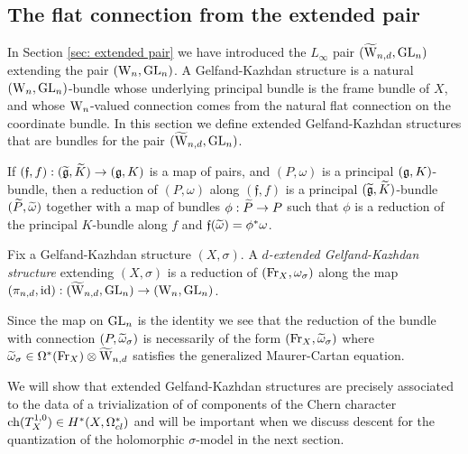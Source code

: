 
\subsection{The flat connection from the extended pair} \label{sec: extended gk}

In Section \ref{sec: extended pair} we have introduced the $L_\infty$ pair $(\TVectd, \GL_n)$ extending the pair $(\Vect, \GL_n)$.
A Gelfand-Kazhdan structure is a natural $(\Vect,\GL_n)$-bundle whose underlying principal bundle is the frame bundle of $X$, and whose $\Vect$-valued connection comes from the natural flat connection on the coordinate bundle. 
In this section we define extended Gelfand-Kazhdan structures that are bundles for the pair $(\TVectd,\GL_n)$.

If $(\mathfrak{f},f) : (\Tilde{\fg},\Tilde{K}) \to (\fg, K)$ is a map of pairs, and $(P,\omega)$ is a principal $(\fg,K)$-bundle, then a reduction of $(P,\omega)$ along $(\mathfrak{f},f)$ is a principal $(\Tilde{\fg}, \Tilde{K})$-bundle $(\Tilde{P}, \Tilde{\omega})$ together with a map of bundles $\phi : \Tilde{P} \to P$ such that $\phi$ is a reduction of the principal $K$-bundle along $f$ and $\mathfrak{f}(\Tilde{\omega}) = \phi^*\omega$.

\begin{dfn}
Fix a Gelfand-Kazhdan structure $(X,\sigma)$.  
A {\em $d$-extended Gelfand-Kazhdan structure} extending $(X,\sigma)$ is a reduction of $(\Fr_X, \omega_{\sigma})$ along the map $(\pi_{n,d}, {\rm id}) : (\TVectd,\GL_n) \to (\Vect, \GL_n)$.
\end{dfn}

Since the map on $\GL_n$ is the identity we see that the reduction of the bundle with connection $(P, \Tilde{\omega}_\sigma)$ is necessarily of the form $(\Fr_X, \Tilde{\omega}_\sigma)$ where $\Tilde{\omega}_\sigma \in \Omega^*(\Fr_X) \tensor \TVectd$ satisfies the generalized Maurer-Cartan equation.

We will show that extended Gelfand-Kazhdan structures are precisely associated to the data of a trivialization of of components of the Chern character $\ch(T_X^{1,0}) \in H^*(X, \Omega^*_{cl})$ and will be important when we discuss descent for the quantization of the holomorphic $\sigma$-model in the next section.

